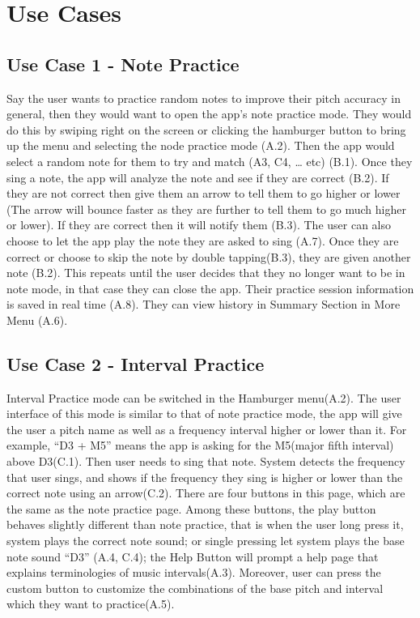 \documentclass{article}
\begin{document}
\section{Use Cases}
\subsection{Use Case 1 - Note Practice}
Say the user wants to practice random notes to improve their pitch accuracy in general, then they would want to open the app’s note practice mode. They would do this by swiping right on the screen or clicking the hamburger button to bring up the menu and selecting the node practice mode (A.2). Then the app would select a random note for them to try and match (A3, C4, … etc) (B.1). Once they sing a note, the app will analyze the note and see if they are correct (B.2). If they are not correct then give them an arrow to tell them to go higher or lower (The arrow will bounce faster as they are further to tell them to go much higher or lower). If they are correct then it will notify them (B.3). The user can also choose to let the app play the note they are asked to sing (A.7). Once they are correct or choose to skip the note by double tapping(B.3), they are given another note (B.2). This repeats until the user decides that they no longer want to be in note mode, in that case they can close the app. Their practice session information is saved in real time (A.8). They can view history in Summary Section in More Menu (A.6).

\subsection{Use Case 2 - Interval Practice}
Interval Practice mode can be switched in the Hamburger menu(A.2). The user interface of this mode is similar to that of note practice mode, the app will give the user a pitch name as well as a frequency interval higher or lower than it. For example, “D3 + M5” means the app is asking for the M5(major fifth interval) above D3(C.1). Then user needs to sing that note. System detects the frequency that user sings, and shows if the frequency they sing is higher or lower than the correct note using an arrow(C.2). There are four buttons in this page, which are the same as the note practice page.  Among these buttons, the play button behaves slightly different than note practice, that is when the user long press it, system plays the correct note sound; or single pressing let system plays the base note sound “D3” (A.4, C.4); the Help Button will prompt a help page that explains terminologies of music intervals(A.3). Moreover, user can press the custom button to customize the combinations of the base pitch and interval which they want to practice(A.5). 
\end{document}
